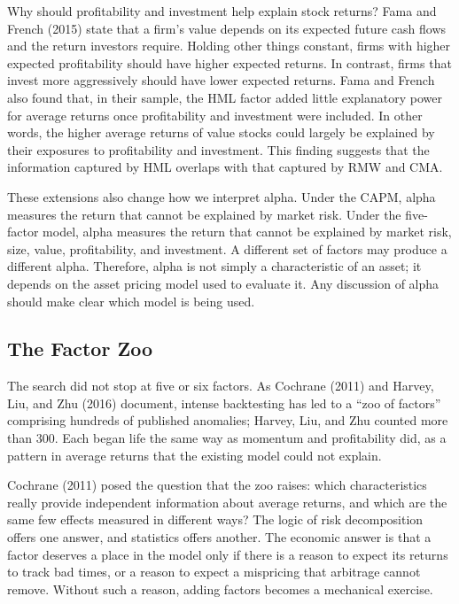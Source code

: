 Why should profitability and investment help explain stock returns? Fama and French (2015) state that a firm's value depends on its expected future cash flows and the return investors require.
Holding other things constant, firms with higher expected profitability should have higher expected returns. In contrast, firms that invest
more aggressively should have lower expected returns. 
Fama and French also found that, in their sample, the
HML factor added little explanatory power for average returns once profitability and investment were included. In other words, the
higher average returns of value stocks could largely be explained by their exposures to profitability and investment. This finding suggests
that the information captured by HML overlaps with that captured by RMW and CMA.

These extensions also change how we interpret alpha. Under the CAPM, alpha measures the return that cannot be explained by market risk.
Under the five-factor model, alpha measures the return that cannot be explained by market risk, size, value, profitability, and investment.
A different set of factors may produce a different alpha. Therefore, alpha is not simply a characteristic of an asset; it depends on the
asset pricing model used to evaluate it. Any discussion of alpha should make clear which model is being used.

\subsection{The Factor Zoo}
\label{sec:04-zoo}
The search did not stop at five or six factors. As Cochrane (2011) and Harvey, Liu, and Zhu (2016) document, intense backtesting has led to a ``zoo of factors'' comprising hundreds of published anomalies; Harvey, Liu, and Zhu counted more than 300. Each began life the same way as momentum and profitability did, as a pattern in average returns that the existing model could not explain.

Cochrane (2011) posed the question that the zoo raises: which characteristics really provide independent information about average returns, and which are the same few effects measured in different ways? The logic of risk decomposition offers one answer, and statistics offers another. The economic answer is that a factor deserves a place in the model only if there is a reason to expect its returns to track bad times, or a reason to expect a mispricing that arbitrage cannot remove. Without such a reason, adding factors becomes a mechanical exercise. 

